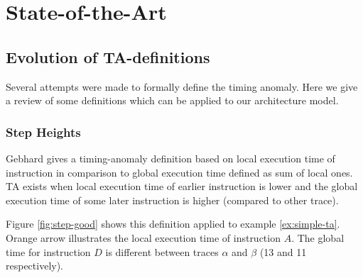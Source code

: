 \chapter{State-of-the-Art}

\section{Evolution of TA-definitions}

Several attempts were made to formally define the timing anomaly. Here we give a review of some definitions which can be applied to our architecture model.

\subsection{Step Heights}

Gebhard \cite{gebhard_timing_2012} gives a timing-anomaly definition based on local execution time of instruction in comparison to global execution time defined as sum of local ones. TA exists when local execution time of earlier instruction is lower and the global execution time of some later instruction is higher (compared to other trace).

Figure \ref{fig:step-good} shows this definition applied to example \ref{ex:simple-ta}. Orange arrow illustrates the local execution time of instruction $A$. The global time for instruction $D$ is different between traces $\alpha$ and $\beta$ (13 and 11 respectively).

